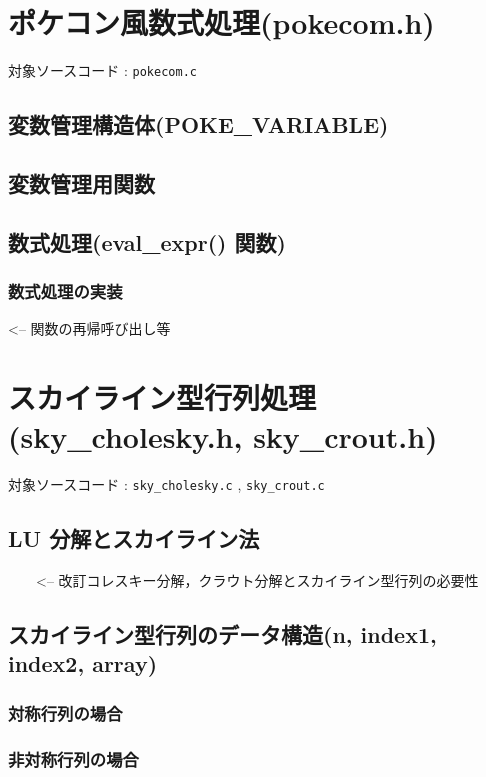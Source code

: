 \documentclass[a4paper,10pt]{jarticle}
\begin{document}

\section{ポケコン風数式処理(pokecom.h)}
対象ソースコード : \verb|pokecom.c|

\subsection{変数管理構造体(POKE\_VARIABLE)}

\subsection{変数管理用関数}

\subsection{数式処理(eval\_expr() 関数)}
\subsubsection{数式処理の実装}   <-- 関数の再帰呼び出し等


\section{スカイライン型行列処理(sky\_cholesky.h, sky\_crout.h)}
対象ソースコード : \verb|sky_cholesky.c| , \verb|sky_crout.c|

\subsection{LU 分解とスカイライン法}
　　<-- 改訂コレスキー分解，クラウト分解とスカイライン型行列の必要性

\subsection{スカイライン型行列のデータ構造(n, index1, index2, array)}
\subsubsection{対称行列の場合}
\subsubsection{非対称行列の場合}
\end{document}
